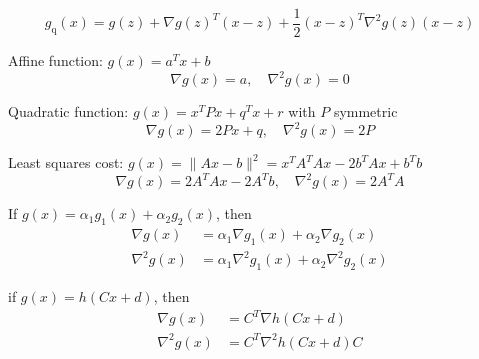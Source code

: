 \begin{definition}
    $$ g_{\mathrm{q}}(x)=g(z)+\nabla g(z)^{T}(x-z)+\frac{1}{2}(x-z)^{T} \nabla^{2} g(z)(x-z) $$
\end{definition}

\begin{example}
    Affine function: $ g(x)=a^{T} x+b $
$$
\nabla g(x)=a, \quad \nabla^{2} g(x)=0
$$

Quadratic function: $ g(x)=x^{T} P x+q^{T} x+r $ with $ P $ symmetric
$$
\nabla g(x)=2 P x+q, \quad \nabla^{2} g(x)=2 P
$$

Least squares cost: $ g(x)=\|A x-b\|^{2}=x^{T} A^{T} A x-2 b^{T} A x+b^{T} b $
$$
\nabla g(x)=2 A^{T} A x-2 A^{T} b, \quad \nabla^{2} g(x)=2 A^{T} A
$$
\end{example}

\begin{theorem}
    If $ g(x)=\alpha_{1} g_{1}(x)+\alpha_{2} g_{2}(x) $, then
$$
\begin{aligned}
\nabla g(x) &=\alpha_{1} \nabla g_{1}(x)+\alpha_{2} \nabla g_{2}(x) \\
\nabla^{2} g(x) &=\alpha_{1} \nabla^{2} g_{1}(x)+\alpha_{2} \nabla^{2} g_{2}(x)
\end{aligned}
$$
\end{theorem}

\begin{theorem}
    if $ g(x)=h(C x+d) $, then
$$
\begin{aligned}
\nabla g(x) &=C^{T} \nabla h(C x+d) \\
\nabla^{2} g(x) &=C^{T} \nabla^{2} h(C x+d) C
\end{aligned}
$$
\end{theorem}

